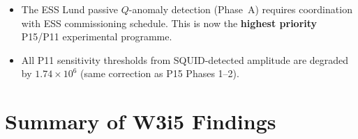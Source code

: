 \documentclass[11pt]{article}
\newcommand{\ee}[1]{\times 10^{#1}}
\begin{document}
\begin{itemize}
\item The ESS Lund passive $Q$-anomaly detection (Phase~A) requires
  coordination with ESS commissioning schedule. This is now the
  \textbf{highest priority} P15/P11 experimental programme.
\item All P11 sensitivity thresholds from SQUID-detected amplitude are
  degraded by $1.74\ee{6}$ (same correction as P15 Phases 1--2).
\end{itemize}

\section{Summary of W3i5 Findings}
\label{sec:summary}
\end{document}
